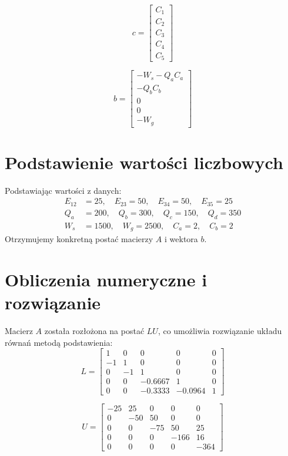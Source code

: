 \documentclass{article}
\begin{document}
\[
c =
\begin{bmatrix}
    C_1 \\
    C_2 \\
    C_3 \\
    C_4 \\
    C_5
\end{bmatrix}
\]

\[
b =
\begin{bmatrix}
    -W_s - Q_a C_a \\
    -Q_b C_b \\
    0 \\
    0 \\
    -W_g
\end{bmatrix}
\]

\section{Podstawienie wartości liczbowych}
Podstawiając wartości z danych:
\begin{align*}
    E_{12} &= 25, \quad E_{23} = 50, \quad E_{34} = 50, \quad E_{35} = 25 \\
    Q_a &= 200, \quad Q_b = 300, \quad Q_c = 150, \quad Q_d = 350 \\
    W_s &= 1500, \quad W_g = 2500, \quad C_a = 2, \quad C_b = 2
\end{align*}
Otrzymujemy konkretną postać macierzy $A$ i wektora $b$.

\section{Obliczenia numeryczne i rozwiązanie}

Macierz $A$ została rozłożona na postać $LU$, co umożliwia rozwiązanie układu równań metodą podstawienia:
\[
L =
\begin{bmatrix}
    1 & 0 & 0 & 0 & 0 \\
    -1 & 1 & 0 & 0 & 0 \\
    0 & -1 & 1 & 0 & 0 \\
    0 & 0 & -0.6667 & 1 & 0 \\
    0 & 0 & -0.3333 & -0.0964 & 1
\end{bmatrix}
\]

\[
U =
\begin{bmatrix}
    -25 & 25 & 0 & 0 & 0 \\
    0 & -50 & 50 & 0 & 0 \\
    0 & 0 & -75 & 50 & 25 \\
    0 & 0 & 0 & -166 & 16 \\
    0 & 0 & 0 & 0 & -364
\end{bmatrix}
\]
\end{document}
